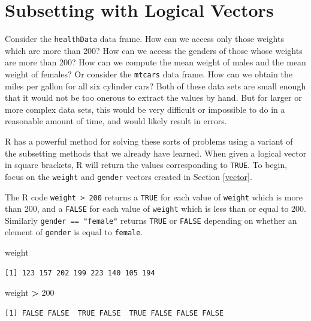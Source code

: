\documentclass[
]{krantz}
\makeatletter
\newenvironment{Shaded}{\begin{snugshade}}{\end{snugshade}}
\newcommand{\DecValTok}[1]{\textcolor[rgb]{0.06,0.06,0.06}{#1}}
\newcommand{\NormalTok}[1]{#1}
\newcommand{\OperatorTok}[1]{\textcolor[rgb]{0.43,0.43,0.43}{\textbf{#1}}}
\newcommand{\StringTok}[1]{\textcolor[rgb]{0.5,0.5,0.5}{#1}}
\newenvironment{kframe}{%
\medskip{}
\setlength{\fboxsep}{.8em}
 \def\at@end@of@kframe{}%
 \ifinner\ifhmode%
  \def\at@end@of@kframe{\end{minipage}}%
  \begin{minipage}{\columnwidth}%
 \fi\fi%
 \def\FrameCommand##1{\hskip\@totalleftmargin \hskip-\fboxsep
 \colorbox{shadecolor}{##1}\hskip-\fboxsep
     \hskip-\linewidth \hskip-\@totalleftmargin \hskip\columnwidth}%
 \MakeFramed {\advance\hsize-\width
   \@totalleftmargin\z@ \linewidth\hsize
   \@setminipage}}%
 {\par\unskip\endMakeFramed%
 \at@end@of@kframe}
\renewenvironment{Shaded}{\begin{kframe}}{\end{kframe}}
\makeatother
\begin{document}
\hypertarget{subsetting}{%
\section{Subsetting with Logical Vectors}\label{subsetting}}

Consider the \texttt{healthData} data frame. How can we access only those weights which are more than 200? How can we access the genders of those whose weights are more than 200? How can we compute the mean weight of males and the mean weight of females? Or consider the \texttt{mtcars} data frame. How can we obtain the miles per gallon for all six cylinder cars? Both of these data sets are small enough that it would not be too onerous to extract the values by hand. But for larger or more complex data sets, this would be very difficult or impossible to do in a reasonable amount of time, and would likely result in errors.

R has a powerful method for solving these sorts of problems using a variant of the subsetting methods that we already have learned. When given a logical vector in square brackets, R will return the values corresponding to \texttt{TRUE}.
To begin, focus on the \texttt{weight} and \texttt{gender} vectors created in Section \ref{vector}.

The R code \texttt{weight\ \textgreater{}\ 200} returns a \texttt{TRUE} for each value of \texttt{weight} which is more than 200, and a \texttt{FALSE} for each value of \texttt{weight} which is less than or equal to 200. Similarly \texttt{gender\ ==\ "female"} returns \texttt{TRUE} or \texttt{FALSE} depending on whether an element of \texttt{gender} is equal to \texttt{female}.

\begin{Shaded}
\begin{Highlighting}[]
\NormalTok{weight}
\end{Highlighting}
\end{Shaded}

\begin{verbatim}
[1] 123 157 202 199 223 140 105 194
\end{verbatim}

\begin{Shaded}
\begin{Highlighting}[]
\NormalTok{weight }\OperatorTok{\textgreater{}}\StringTok{ }\DecValTok{200}
\end{Highlighting}
\end{Shaded}

\begin{verbatim}
[1] FALSE FALSE  TRUE FALSE  TRUE FALSE FALSE FALSE
\end{verbatim}
\end{document}
